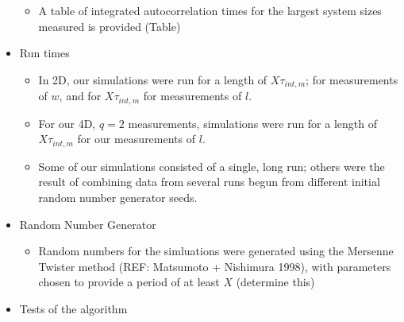 \documentclass[11pt]{article}
\begin{document}
\begin{itemize}
\begin{itemize}
\item A table of integrated autocorrelation times for the largest system sizes measured is provided (Table)\\
\label{sec-4.2.5.3.2}

\end{itemize} %

\item Run times\\
\label{sec-4.2.5.4}

\begin{itemize}

\item In 2D, our simulations were run for a length of $X \tau_{int,m}$; for measurements of $w$, and for $X  \tau_{int,m}$ for measurements of $l$.\\
\label{sec-4.2.5.4.1}


\item For our 4D, $q=2$ measurements, simulations were run for a length of $X \tau_{int,m}$ for our measurements of $l$.\\
\label{sec-4.2.5.4.2}


\item Some of our simulations consisted of a single, long run; others were the result of combining data from several runs begun from different initial random number generator seeds.\\
\label{sec-4.2.5.4.3}

\end{itemize} %

\item Random Number Generator\\
\label{sec-4.2.5.5}

\begin{itemize}

\item Random numbers for the simluations were generated using the Mersenne Twister method (REF:  Matsumoto + Nishimura 1998), with parameters chosen to provide a period of at least $X$ (determine this)\\
\label{sec-4.2.5.5.1}


\end{itemize} %

\item Tests of the algorithm\\
\label{sec-4.2.5.6}

\begin{itemize}


\end{itemize}
\end{itemize}
\end{document}
